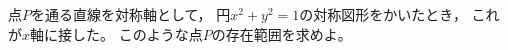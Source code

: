 \begin{problem}
  点$P$を通る直線を対称軸として，
円$x^2+y^2=1$の対称図形をかいたとき，
これが$x$軸に接した。
このような点$P$の存在範囲を求めよ。
\end{problem}
